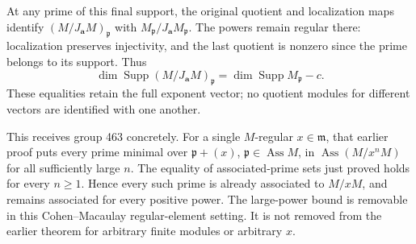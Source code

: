 At any prime of this final support, the original quotient and localization maps identify \((M/J_{\mathbf a}M)_{\mathfrak p}\) with \(M_{\mathfrak p}/J_{\mathbf a}M_{\mathfrak p}\). The powers remain regular there: localization preserves injectivity, and the last quotient is nonzero since the prime belongs to its support. Thus \[
 \dim\operatorname{Supp}(M/J_{\mathbf a}M)_{\mathfrak p}
 =\dim\operatorname{Supp}M_{\mathfrak p}-c .
\] These equalities retain the full exponent vector; no quotient modules for different vectors are identified with one another.

This receives group 463 concretely. For a single \(M\)-regular \(x\in\mathfrak m\), that earlier proof puts every prime minimal over \(\mathfrak p+(x)\), \(\mathfrak p\in\operatorname{Ass}M\), in \(\operatorname{Ass}(M/x^nM)\) for all sufficiently large \(n\). The equality of associated-prime sets just proved holds for every \(n\ge1\). Hence every such prime is already associated to \(M/xM\), and remains associated for every positive power. The large-power bound is removable in this Cohen--Macaulay regular-element setting. It is not removed from the earlier theorem for arbitrary finite modules or arbitrary \(x\).
